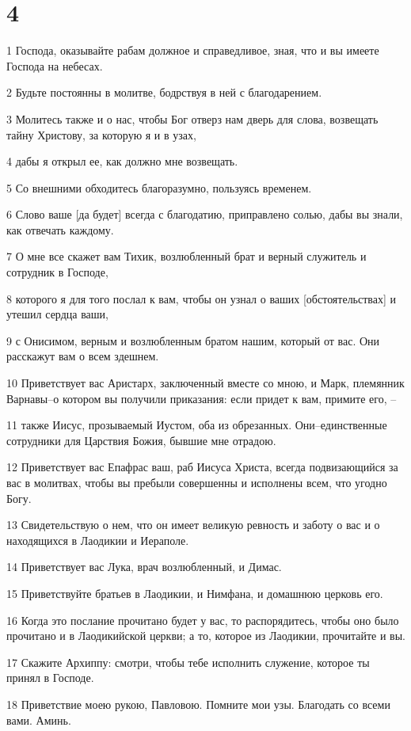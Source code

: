 \chapter{4}

\par 1 Господа, оказывайте рабам должное и справедливое, зная, что и вы имеете Господа на небесах.
\par 2 Будьте постоянны в молитве, бодрствуя в ней с благодарением.
\par 3 Молитесь также и о нас, чтобы Бог отверз нам дверь для слова, возвещать тайну Христову, за которую я и в узах,
\par 4 дабы я открыл ее, как должно мне возвещать.
\par 5 Со внешними обходитесь благоразумно, пользуясь временем.
\par 6 Слово ваше [да будет] всегда с благодатию, приправлено солью, дабы вы знали, как отвечать каждому.
\par 7 О мне все скажет вам Тихик, возлюбленный брат и верный служитель и сотрудник в Господе,
\par 8 которого я для того послал к вам, чтобы он узнал о ваших [обстоятельствах] и утешил сердца ваши,
\par 9 с Онисимом, верным и возлюбленным братом нашим, который от вас. Они расскажут вам о всем здешнем.
\par 10 Приветствует вас Аристарх, заключенный вместе со мною, и Марк, племянник Варнавы--о котором вы получили приказания: если придет к вам, примите его, --
\par 11 также Иисус, прозываемый Иустом, оба из обрезанных. Они--единственные сотрудники для Царствия Божия, бывшие мне отрадою.
\par 12 Приветствует вас Епафрас ваш, раб Иисуса Христа, всегда подвизающийся за вас в молитвах, чтобы вы пребыли совершенны и исполнены всем, что угодно Богу.
\par 13 Свидетельствую о нем, что он имеет великую ревность и заботу о вас и о находящихся в Лаодикии и Иераполе.
\par 14 Приветствует вас Лука, врач возлюбленный, и Димас.
\par 15 Приветствуйте братьев в Лаодикии, и Нимфана, и домашнюю церковь его.
\par 16 Когда это послание прочитано будет у вас, то распорядитесь, чтобы оно было прочитано и в Лаодикийской церкви; а то, которое из Лаодикии, прочитайте и вы.
\par 17 Скажите Архиппу: смотри, чтобы тебе исполнить служение, которое ты принял в Господе.
\par 18 Приветствие моею рукою, Павловою. Помните мои узы. Благодать со всеми вами. Аминь.


